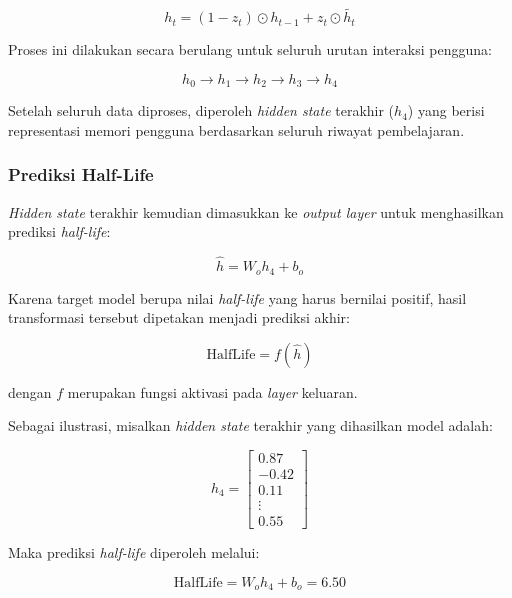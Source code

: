 \begin{equation}
h_t
=
(1-z_t)\odot h_{t-1}
+
z_t\odot \tilde{h_t}
\end{equation}

Proses ini dilakukan secara berulang untuk seluruh urutan interaksi pengguna:

\begin{equation}
h_0 \rightarrow h_1 \rightarrow h_2 \rightarrow h_3 \rightarrow h_4
\end{equation}

Setelah seluruh data diproses, diperoleh \textit{hidden state} terakhir ($h_4$) yang berisi representasi memori pengguna berdasarkan seluruh riwayat pembelajaran.

\subsubsection{Prediksi Half-Life}

\textit{Hidden state} terakhir kemudian dimasukkan ke \textit{output layer} untuk menghasilkan prediksi \textit{half-life}:

\begin{equation}
\hat{h}
=
W_oh_4+b_o
\end{equation}

Karena target model berupa nilai \textit{half-life} yang harus bernilai positif, hasil transformasi tersebut dipetakan menjadi prediksi akhir:

\begin{equation}
\text{HalfLife}
=
f(\hat{h})
\end{equation}

dengan $f$ merupakan fungsi aktivasi pada \textit{layer} keluaran.

Sebagai ilustrasi, misalkan \textit{hidden state} terakhir yang dihasilkan model adalah:

\begin{equation}
h_4=
\begin{bmatrix}
0.87\\
-0.42\\
0.11\\
\vdots\\
0.55
\end{bmatrix}
\end{equation}

Maka prediksi \textit{half-life} diperoleh melalui:

\begin{equation}
\text{HalfLife}
=
W_oh_4+b_o
=
6.50
\end{equation}

